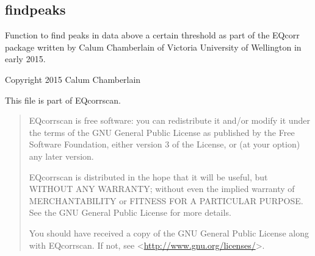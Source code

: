 \documentclass[a4paper,10pt,english]{sphinxmanual}
\begin{document}
\subsection{findpeaks}
\label{utils:module-findpeaks}\label{utils:findpeaks}
Function to find peaks in data above a certain threshold as part of the EQcorr
package written by Calum Chamberlain of Victoria University of Wellington in
early 2015.

Copyright 2015 Calum Chamberlain

This file is part of EQcorrscan.
\begin{quote}

EQcorrscan is free software: you can redistribute it and/or modify
it under the terms of the GNU General Public License as published by
the Free Software Foundation, either version 3 of the License, or
(at your option) any later version.

EQcorrscan is distributed in the hope that it will be useful,
but WITHOUT ANY WARRANTY; without even the implied warranty of
MERCHANTABILITY or FITNESS FOR A PARTICULAR PURPOSE.  See the
GNU General Public License for more details.

You should have received a copy of the GNU General Public License
along with EQcorrscan.  If not, see \textless{}\href{http://www.gnu.org/licenses/}{http://www.gnu.org/licenses/}\textgreater{}.
\end{quote}
\end{document}
